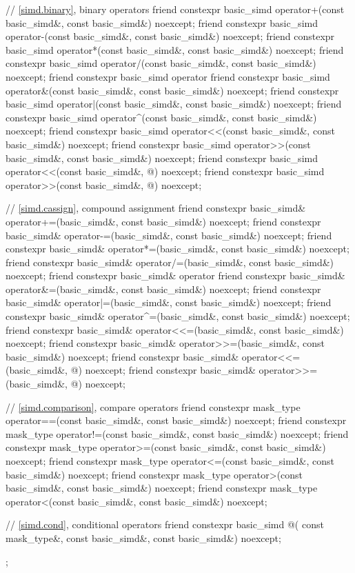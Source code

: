\begin{codeblock}
{  // \ref{simd.binary},  binary operators
  friend constexpr basic_simd operator+(const basic_simd&, const basic_simd&) noexcept;
  friend constexpr basic_simd operator-(const basic_simd&, const basic_simd&) noexcept;
  friend constexpr basic_simd operator*(const basic_simd&, const basic_simd&) noexcept;
  friend constexpr basic_simd operator/(const basic_simd&, const basic_simd&) noexcept;
  friend constexpr basic_simd operator%
  friend constexpr basic_simd operator&(const basic_simd&, const basic_simd&) noexcept;
  friend constexpr basic_simd operator|(const basic_simd&, const basic_simd&) noexcept;
  friend constexpr basic_simd operator^(const basic_simd&, const basic_simd&) noexcept;
  friend constexpr basic_simd operator<<(const basic_simd&, const basic_simd&) noexcept;
  friend constexpr basic_simd operator>>(const basic_simd&, const basic_simd&) noexcept;
  friend constexpr basic_simd operator<<(const basic_simd&, @\simdsizetype@) noexcept;
  friend constexpr basic_simd operator>>(const basic_simd&, @\simdsizetype@) noexcept;

  // \ref{simd.cassign},  compound assignment
  friend constexpr basic_simd& operator+=(basic_simd&, const basic_simd&) noexcept;
  friend constexpr basic_simd& operator-=(basic_simd&, const basic_simd&) noexcept;
  friend constexpr basic_simd& operator*=(basic_simd&, const basic_simd&) noexcept;
  friend constexpr basic_simd& operator/=(basic_simd&, const basic_simd&) noexcept;
  friend constexpr basic_simd& operator%
  friend constexpr basic_simd& operator&=(basic_simd&, const basic_simd&) noexcept;
  friend constexpr basic_simd& operator|=(basic_simd&, const basic_simd&) noexcept;
  friend constexpr basic_simd& operator^=(basic_simd&, const basic_simd&) noexcept;
  friend constexpr basic_simd& operator<<=(basic_simd&, const basic_simd&) noexcept;
  friend constexpr basic_simd& operator>>=(basic_simd&, const basic_simd&) noexcept;
  friend constexpr basic_simd& operator<<=(basic_simd&, @\simdsizetype@) noexcept;
  friend constexpr basic_simd& operator>>=(basic_simd&, @\simdsizetype@) noexcept;

  // \ref{simd.comparison},  compare operators
  friend constexpr mask_type operator==(const basic_simd&, const basic_simd&) noexcept;
  friend constexpr mask_type operator!=(const basic_simd&, const basic_simd&) noexcept;
  friend constexpr mask_type operator>=(const basic_simd&, const basic_simd&) noexcept;
  friend constexpr mask_type operator<=(const basic_simd&, const basic_simd&) noexcept;
  friend constexpr mask_type operator>(const basic_simd&, const basic_simd&) noexcept;
  friend constexpr mask_type operator<(const basic_simd&, const basic_simd&) noexcept;

  // \ref{simd.cond},  conditional operators
  friend constexpr basic_simd @\simdselect@(
    const mask_type&, const basic_simd&, const basic_simd&) noexcept;
};
\end{codeblock}


